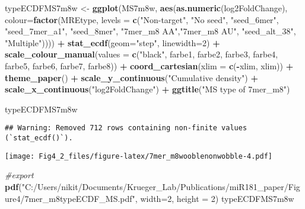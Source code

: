 \documentclass[
]{article}
\newenvironment{Shaded}{\begin{snugshade}}{\end{snugshade}}
\newcommand{\AttributeTok}[1]{\textcolor[rgb]{0.13,0.29,0.53}{#1}}
\newcommand{\CommentTok}[1]{\textcolor[rgb]{0.56,0.35,0.01}{\textit{#1}}}
\newcommand{\DecValTok}[1]{\textcolor[rgb]{0.00,0.00,0.81}{#1}}
\newcommand{\FunctionTok}[1]{\textcolor[rgb]{0.13,0.29,0.53}{\textbf{#1}}}
\newcommand{\NormalTok}[1]{#1}
\newcommand{\OtherTok}[1]{\textcolor[rgb]{0.56,0.35,0.01}{#1}}
\newcommand{\SpecialCharTok}[1]{\textcolor[rgb]{0.81,0.36,0.00}{\textbf{#1}}}
\newcommand{\StringTok}[1]{\textcolor[rgb]{0.31,0.60,0.02}{#1}}
\begin{document}
\begin{Shaded}
\begin{Highlighting}[]
\NormalTok{typeECDFMS7m8w }\OtherTok{\textless{}{-}} \FunctionTok{ggplot}\NormalTok{(MS7m8w, }\FunctionTok{aes}\NormalTok{(}\FunctionTok{as.numeric}\NormalTok{(log2FoldChange), }
                              \AttributeTok{colour=}\FunctionTok{factor}\NormalTok{(MREtype, }\AttributeTok{levels =} \FunctionTok{c}\NormalTok{(}\StringTok{"Non{-}target"}\NormalTok{, }\StringTok{"No seed"}\NormalTok{, }\StringTok{"seed\_6mer"}\NormalTok{, }\StringTok{"seed\_7mer\_a1"}\NormalTok{, }\StringTok{"seed\_8mer"}\NormalTok{, }\StringTok{"7mer\_m8 AA"}\NormalTok{,}\StringTok{"7mer\_m8 AU"}\NormalTok{, }\StringTok{"seed\_alt\_38"}\NormalTok{, }\StringTok{"Multiple"}\NormalTok{)))) }\SpecialCharTok{+} 
  \FunctionTok{stat\_ecdf}\NormalTok{(}\AttributeTok{geom=}\StringTok{"step"}\NormalTok{, }\AttributeTok{linewidth=}\DecValTok{2}\NormalTok{) }\SpecialCharTok{+}
  \FunctionTok{scale\_colour\_manual}\NormalTok{(}\AttributeTok{values =} \FunctionTok{c}\NormalTok{(}\StringTok{"black"}\NormalTok{, farbe1, farbe2, farbe3, farbe4, farbe5, farbe6, farbe7, farbe8)) }\SpecialCharTok{+}
  \FunctionTok{coord\_cartesian}\NormalTok{(}\AttributeTok{xlim =} \FunctionTok{c}\NormalTok{(}\SpecialCharTok{{-}}\NormalTok{xlim, xlim)) }\SpecialCharTok{+} 
  \FunctionTok{theme\_paper}\NormalTok{() }\SpecialCharTok{+}
  \FunctionTok{scale\_y\_continuous}\NormalTok{(}\StringTok{"Cumulative density"}\NormalTok{) }\SpecialCharTok{+} \FunctionTok{scale\_x\_continuous}\NormalTok{(}\StringTok{"log2FoldChange"}\NormalTok{) }\SpecialCharTok{+}
  \FunctionTok{ggtitle}\NormalTok{(}\StringTok{"MS type of 7mer\_m8"}\NormalTok{)}

\NormalTok{typeECDFMS7m8w}
\end{Highlighting}
\end{Shaded}

\begin{verbatim}
## Warning: Removed 712 rows containing non-finite values (`stat_ecdf()`).
\end{verbatim}

\texttt{[image: Fig4\_2\_files/figure-latex/7mer\_m8wooblenonwobble-4.pdf]}

\begin{Shaded}
\begin{Highlighting}[]
\CommentTok{\#export}
\FunctionTok{pdf}\NormalTok{(}\StringTok{"C:/Users/nikit/Documents/Krueger\_Lab/Publications/miR181\_paper/Figure4/7mer\_m8typeECDF\_MS.pdf"}\NormalTok{, }\AttributeTok{width=}\DecValTok{2}\NormalTok{, }\AttributeTok{height =} \DecValTok{2}\NormalTok{)}
\NormalTok{typeECDFMS7m8w}
\end{Highlighting}
\end{Shaded}
\end{document}
